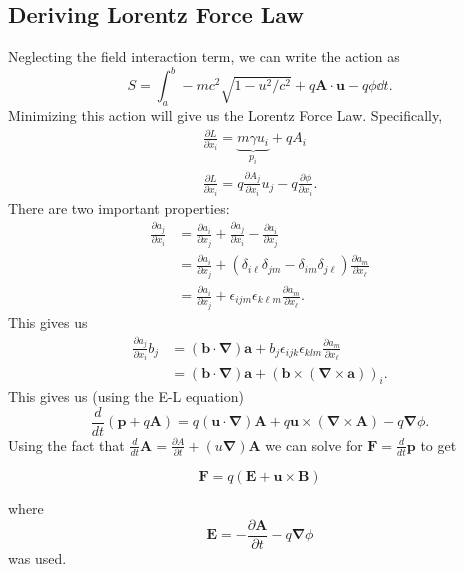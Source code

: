 \documentclass{article}
\numberwithin{equation}{subsection}
\begin{document}
\subsection{Deriving Lorentz Force Law}
Neglecting the field interaction term, we can write the action as 
\begin{equation*}
    S = \int_a^b - mc^2\sqrt{1-u^2/c^2} + q\bm{A} \cdot \bm{u} - q\phi \dd{t}.
\end{equation*}
Minimizing this action will give us the Lorentz Force Law. Specifically,
\begin{align*}
    \frac{\partial L}{\partial \dot{x}_i} = \underbrace{m\gamma u_i}_{p_i} + qA_i \\ 
    \frac{\partial L}{\partial x_i} = q \frac{\partial A_j}{\partial x_i}u_j - q \frac{\partial \phi}{\partial x_i}.
\end{align*}
There are two important properties:
\begin{align*}
    \frac{\partial a_j}{\partial x_i} &= \frac{\partial a_i}{\partial x_j} + \frac{\partial a_j}{\partial x_i} - \frac{\partial a_i}{\partial x_j} \\ 
    &= \frac{\partial a_i}{\partial x_j} + \left(\delta_{i\ell}\delta_{jm} - \delta_{im}\delta_{j\ell}\right)\frac{\partial a_m}{\partial x_\ell} \\ 
    &= \frac{\partial a_i}{\partial x_j} + \epsilon_{ijm}\epsilon_{k\ell m}\frac{\partial a_m}{\partial x_\ell}.
\end{align*}
This gives us 
\begin{align*}
    \frac{\partial a_j}{\partial x_i} b_j &= \left(\bm{b}\cdot \bm{\nabla}\right) \bm{a} + b_j \epsilon_{ijk}\epsilon_{klm}\frac{\partial a_m}{\partial x_\ell} \\ 
    &= (\bm{b}\cdot \bm{\nabla})\bm{a} + \left(\bm{b} \times \left(\bm{\nabla}\times \bm{a}\right)\right)_i.
\end{align*}
This gives us (using the E-L equation)
\begin{equation*}
    \frac{d}{dt}(\bm{p} + q\bm{A}) = q(\bm{u}\cdot \bm{\nabla})\bm{A} + q\bm{u} \times (\bm{\nabla}\times \bm{A}) - q\bm{\nabla}\phi.
\end{equation*}
Using the fact that $\frac{d}{dt}\bm{A} = \frac{\partial A}{\partial t} + (u\bm{\nabla})\bm{A}$ we can solve for $\bm{F} = \frac{d}{dt}\bm{p}$ to get
\begin{meq}
    \begin{equation}
        \bm{F} = q\left(\bm{E} + \bm{u}\times \bm{B}\right)
    \end{equation}
\end{meq} 
where 
\begin{equation*}
    \bm{E} = -\frac{\partial \bm{A}}{\partial t} - q\bm{\nabla}\phi
\end{equation*}
was used.
\end{document}
